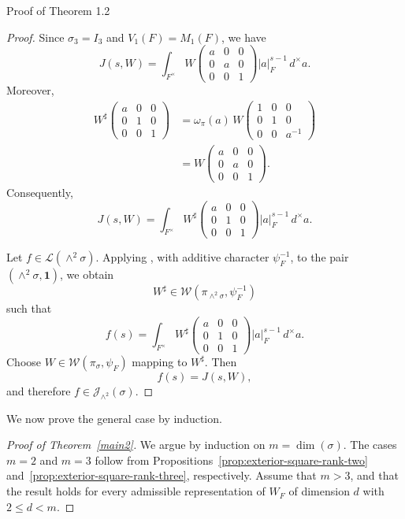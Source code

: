 \documentclass[12pt,reqno]{amsart}
\numberwithin{equation}{section}%
\numberwithin{equation}{subsection}
\theoremstyle{definition}
\theoremstyle{remark}
\begin{document}
\begin{section}{Proof of Theorem 1.2}
\begin{proof}
Since \(\sigma_3=I_3\) and \(V_1(F)=M_1(F)\), we have
\[
J(s,W)
=
\int_{F^\times}
W\begin{pmatrix}
a&0&0\\
0&a&0\\
0&0&1
\end{pmatrix}
|a|_F^{s-1}\,d^\times a.
\]
Moreover,
\[
\begin{aligned}
W^\sharp
\begin{pmatrix}
a&0&0\\
0&1&0\\
0&0&1
\end{pmatrix}
&=
\omega_\pi(a)\,
W\begin{pmatrix}
1&0&0\\
0&1&0\\
0&0&a^{-1}
\end{pmatrix}\\
&=
W\begin{pmatrix}
a&0&0\\
0&a&0\\
0&0&1
\end{pmatrix}.
\end{aligned}
\]
Consequently,
\[
J(s,W)
=
\int_{F^\times}
W^\sharp
\begin{pmatrix}
a&0&0\\
0&1&0\\
0&0&1
\end{pmatrix}
|a|_F^{s-1}\,d^\times a.
\]

Let \(f\in\mathcal{L}(\wedge^2\sigma)\). Applying
\cite[Theorem~2.6(i)]{Jac2009}, with additive character
\(\psi_F^{-1}\), to the pair
$(\wedge^2\sigma,\mathbf{1})$,
we obtain
\[
W^\sharp
\in
\mathcal{W}(\pi_{\wedge^2\sigma},\psi_F^{-1})
\]
such that
\[
f(s)
=
\int_{F^\times}
W^\sharp
\begin{pmatrix}
a&0&0\\
0&1&0\\
0&0&1
\end{pmatrix}
|a|_F^{s-1}\,d^\times a.
\]
Choose \(W\in\mathcal{W}(\pi_\sigma,\psi_F)\) mapping to
\(W^\sharp\). Then
\[
f(s)=J(s,W),
\]
and therefore
$f\in\mathcal{J}_{\wedge^2}(\sigma).$
\end{proof}
We now prove the general case by induction.

\begin{proof}[Proof of Theorem~\ref{main2}]
We argue by induction on $m=\dim(\sigma)$. The cases $m=2$ and $m=3$ follow from Propositions~\ref{prop:exterior-square-rank-two} and~\ref{prop:exterior-square-rank-three}, respectively. Assume that $m>3$, and that the result holds for every admissible representation of $W_F$ of dimension $d$ with $2 \leq d < m$.


\end{proof}
\end{section}
\end{document}
